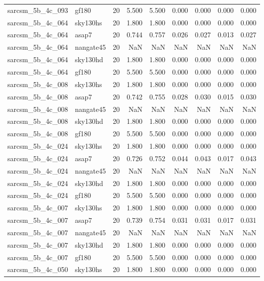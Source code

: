 \begin{tabular}{llrrrrrrr}
sarcsm\_5b\_4c\_093 & gf180 & 20 & 5.500 & 5.500 & 0.000 & 0.000 & 0.000 & 0.000 \\
sarcsm\_5b\_4c\_064 & sky130hs & 20 & 1.800 & 1.800 & 0.000 & 0.000 & 0.000 & 0.000 \\
sarcsm\_5b\_4c\_064 & asap7 & 20 & 0.744 & 0.757 & 0.026 & 0.027 & 0.013 & 0.027 \\
sarcsm\_5b\_4c\_064 & nangate45 & 20 & NaN & NaN & NaN & NaN & NaN & NaN \\
sarcsm\_5b\_4c\_064 & sky130hd & 20 & 1.800 & 1.800 & 0.000 & 0.000 & 0.000 & 0.000 \\
sarcsm\_5b\_4c\_064 & gf180 & 20 & 5.500 & 5.500 & 0.000 & 0.000 & 0.000 & 0.000 \\
sarcsm\_5b\_4c\_008 & sky130hs & 20 & 1.800 & 1.800 & 0.000 & 0.000 & 0.000 & 0.000 \\
sarcsm\_5b\_4c\_008 & asap7 & 20 & 0.742 & 0.755 & 0.028 & 0.030 & 0.015 & 0.030 \\
sarcsm\_5b\_4c\_008 & nangate45 & 20 & NaN & NaN & NaN & NaN & NaN & NaN \\
sarcsm\_5b\_4c\_008 & sky130hd & 20 & 1.800 & 1.800 & 0.000 & 0.000 & 0.000 & 0.000 \\
sarcsm\_5b\_4c\_008 & gf180 & 20 & 5.500 & 5.500 & 0.000 & 0.000 & 0.000 & 0.000 \\
sarcsm\_5b\_4c\_024 & sky130hs & 20 & 1.800 & 1.800 & 0.000 & 0.000 & 0.000 & 0.000 \\
sarcsm\_5b\_4c\_024 & asap7 & 20 & 0.726 & 0.752 & 0.044 & 0.043 & 0.017 & 0.043 \\
sarcsm\_5b\_4c\_024 & nangate45 & 20 & NaN & NaN & NaN & NaN & NaN & NaN \\
sarcsm\_5b\_4c\_024 & sky130hd & 20 & 1.800 & 1.800 & 0.000 & 0.000 & 0.000 & 0.000 \\
sarcsm\_5b\_4c\_024 & gf180 & 20 & 5.500 & 5.500 & 0.000 & 0.000 & 0.000 & 0.000 \\
sarcsm\_5b\_4c\_007 & sky130hs & 20 & 1.800 & 1.800 & 0.000 & 0.000 & 0.000 & 0.000 \\
sarcsm\_5b\_4c\_007 & asap7 & 20 & 0.739 & 0.754 & 0.031 & 0.031 & 0.017 & 0.031 \\
sarcsm\_5b\_4c\_007 & nangate45 & 20 & NaN & NaN & NaN & NaN & NaN & NaN \\
sarcsm\_5b\_4c\_007 & sky130hd & 20 & 1.800 & 1.800 & 0.000 & 0.000 & 0.000 & 0.000 \\
sarcsm\_5b\_4c\_007 & gf180 & 20 & 5.500 & 5.500 & 0.000 & 0.000 & 0.000 & 0.000 \\
sarcsm\_5b\_4c\_050 & sky130hs & 20 & 1.800 & 1.800 & 0.000 & 0.000 & 0.000 & 0.000 \\

\end{tabular}
